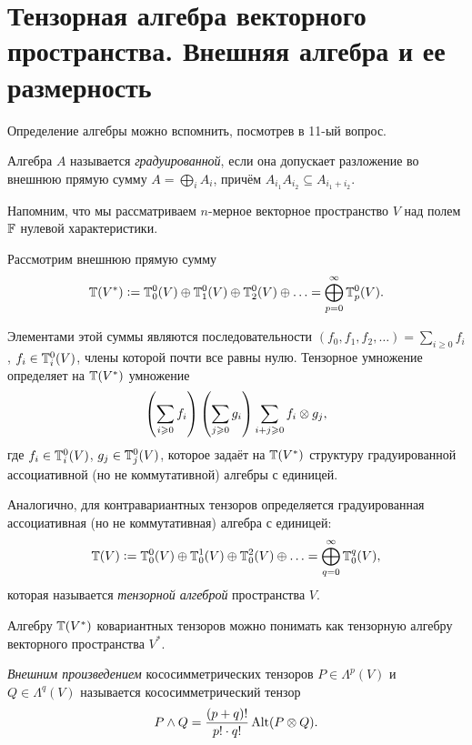 \section{Тензорная алгебра векторного пространства. Внешняя алгебра и ее размерность}

Определение алгебры можно вспомнить, посмотрев в 11-ый вопрос.

\begin{definition}
    Алгебра $A$ называется \textit{градуированной}, если она допускает разложение во внешнюю прямую сумму $A = \bigoplus\limits_iA_i$, причём $A_{i_1}A_{i_2} \subseteq A_{i_1 + i_2}$.
\end{definition}

Напомним, что мы рассматриваем $n$-мерное векторное пространство $V$ над полем $\mathbb{F}$ нулевой характеристики.

Рассмотрим внешнюю прямую сумму
\[
    \mathbb{T}(V^\ast) \vcentcolon = \mathbb{T}_0^0(V) \oplus \mathbb{T}_1^0(V) \oplus \mathbb{T}_2^0(V) \oplus \ldots = \bigoplus_{p = 0}^\infty\mathbb{T}_p^0(V).
\]

Элементами этой суммы являются последовательности $(f_0, f_1, f_2, \ldots) = \sum_{i \geqslant 0}f_i$, $f_i \in \mathbb{T}_i^0(V)$, члены которой почти все равны нулю. Тензорное умножение определяет на $\mathbb{T}(V^\ast)$ умножение
\[
    \left(\sum_{i \geqslant 0}f_i\right)\left(\sum_{j \geqslant 0}g_i\right)\sum_{i + j \geqslant 0}f_i \otimes g_j,
\]
где $f_i \in \mathbb{T}_i^0(V)$, $g_j \in \mathbb{T}_j^0(V)$, которое задаёт на $\mathbb{T}(V^\ast)$ структуру градуированной ассоциативной (но не коммутативной) алгебры с единицей.

\begin{definition}
    Аналогично, для контравариантных тензоров определяется градуированная ассоциативная (но не коммутативная) алгебра с единицей:
    \[
        \mathbb{T}(V) \vcentcolon = \mathbb{T}_0^0(V) \oplus \mathbb{T}_0^1(V) \oplus \mathbb{T}_0^2(V) \oplus \ldots = \bigoplus_{q = 0}^\infty\mathbb{T}_0^q(V),
    \]
    которая называется \textit{тензорной алгеброй} пространства $V$.
\end{definition}

Алгебру $\mathbb{T}(V^\ast)$ ковариантных тензоров можно понимать как тензорную алгебру векторного пространства $V^\ast$.

\begin{definition}
    \textit{Внешним произведением} кососимметрических тензоров $P \in \Lambda^p(V)$ и $Q \in \Lambda^q(V)$ называется кососимметрический тензор
    \[
        P \wedge Q = \frac{(p + q)!}{p! \cdot q!}\operatorname{Alt}(P \otimes Q).
    \]
\end{definition}

